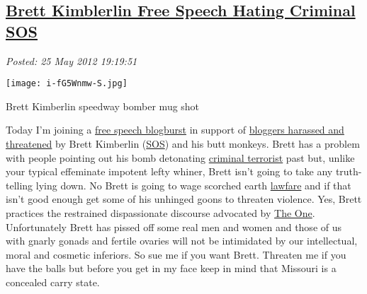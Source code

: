 %

\subsection*{\href{http://bakerjd99.wordpress.com/2012/05/25/brett-kimblerlin-free-speech-hating-criminal-sos/}{Brett Kimblerlin Free Speech Hating Criminal SOS}}


\noindent\emph{Posted: 25 May 2012 19:19:51}
\vspace{6pt}

\captionsetup[floatingfigure]{labelformat=empty}
\begin{floatingfigure}[r]{0.25\textwidth}
\centering
\texttt{[image: i-fG5Wnmw-S.jpg]}
\caption{Brett Kimberlin speedway bomber mug shot}
\label{fig:2856X0}
\end{floatingfigure} Today I'm joining a
\href{http://michellemalkin.com/2012/05/23/free-speech-show-solidarity-for-targeted-conservative-bloggers/}{free
speech blogburst} in support of
\href{http://patterico.com/2012/05/25/convicted-bomber-brett-kimberlin-neal-rauhauser-ron-brynaert-and-their-campaign-of-political-terrorism/}{bloggers
harassed and threatened} by Brett Kimberlin
(\href{http://www.urbandictionary.com/define.php?term=sack\%20of\%20shit}{SOS})
and his butt monkeys. Brett has a problem with people pointing out his
bomb detonating \href{http://pjmedia.com/blog/brett-kimberlin-and-the-future-of-blogbursts/}{criminal terrorist} past but, unlike your typical
effeminate impotent lefty whiner, Brett isn't going to take any
truth-telling lying down. No Brett is going to wage scorched earth
\href{http://en.wikipedia.org/wiki/Lawfare}{lawfare} and if that isn't
good enough get some of his unhinged goons to threaten violence. Yes,
Brett practices the restrained dispassionate discourse advocated by
\href{http://www.youtube.com/watch?v=mopkn0lPzM8}{The One}.
Unfortunately Brett has pissed off some real men and women and those of
us with gnarly gonads and fertile ovaries will not be intimidated by our
intellectual, moral and cosmetic inferiors. So sue me if you want Brett.
Threaten me if you have the balls but before you get in my face keep in
mind that Missouri is a concealed carry state.



